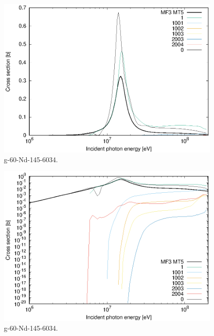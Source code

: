 \begin{figure}
 \includegraphics[width=\linewidth]{eps/g_60-Nd-145_6034.eps}
  \caption{g-60-Nd-145-6034.}
\end{figure}
\begin{figure}
 \includegraphics[width=\linewidth]{eps-log/g_60-Nd-145_6034.eps}
 \caption{g-60-Nd-145-6034.}
\end{figure}
\newpage \clearpage

